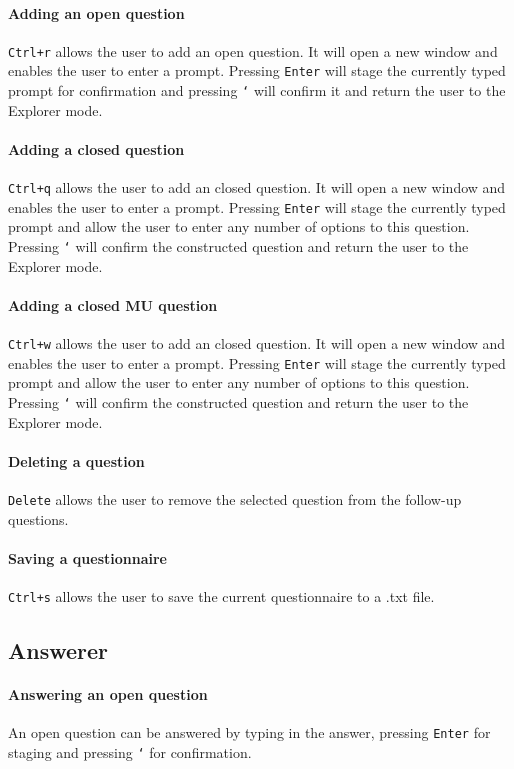 \documentclass[11pt,a4paper]{article}
\begin{document}
\paragraph{Adding an open question}
\texttt{Ctrl+r} allows the user to add an open question. It will open a new window and enables the user to enter a prompt. Pressing \texttt{Enter} will stage the currently typed prompt for confirmation and pressing \texttt{`} will confirm it and return the user to the Explorer mode.

\paragraph{Adding a closed question}
\texttt{Ctrl+q} allows the user to add an closed question. It will open a new window and enables the user to enter a prompt. Pressing \texttt{Enter} will stage the currently typed prompt and allow the user to enter any number of options to this question. Pressing \texttt{`} will confirm the constructed question and return the user to the Explorer mode.

\paragraph{Adding a closed MU question}
\texttt{Ctrl+w} allows the user to add an closed question. It will open a new window and enables the user to enter a prompt. Pressing \texttt{Enter} will stage the currently typed prompt and allow the user to enter any number of options to this question. Pressing \texttt{`} will confirm the constructed question and return the user to the Explorer mode.

\paragraph{Deleting a question}
\texttt{Delete} allows the user to remove the selected question from the follow-up questions.

\paragraph{Saving a questionnaire}
\texttt{Ctrl+s} allows the user to save the current questionnaire to a .txt file.

\subsection{Answerer}
\paragraph{Answering an open question}
An open question can be answered by typing in the answer, pressing \texttt{Enter} for staging and pressing \texttt{`} for confirmation.
\end{document}
